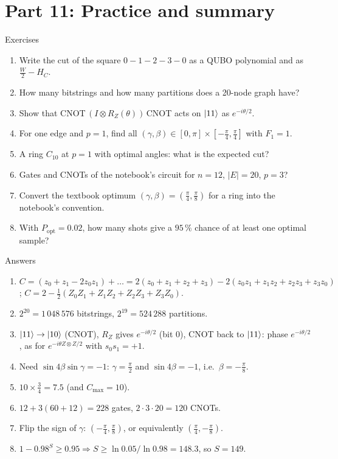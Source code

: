 \documentclass[aspectratio=169,11pt]{beamer}
\begin{document}
\section{Part 11: Practice and summary}
\begin{frame}{Exercises}
  \begin{enumerate}
    \item Write the cut of the square $0{-}1{-}2{-}3{-}0$ as a QUBO polynomial and as $\frac W2 - H_C$.
    \item How many bitstrings and how many partitions does a 20-node graph have?
    \item Show that CNOT$\,(I\otimes R_Z(\theta))\,$CNOT acts on $\ket{11}$ as $e^{-i\theta/2}$.
    \item For one edge and $p = 1$, find all $(\gamma, \beta) \in [0, \pi]\times[-\frac\pi4, \frac\pi4]$ with $F_1 = 1$.
    \item A ring $C_{10}$ at $p = 1$ with optimal angles: what is the expected cut?
    \item Gates and CNOTs of the notebook's circuit for $n = 12$, $|E| = 20$, $p = 3$?
    \item Convert the textbook optimum $(\gamma, \beta) = (\frac\pi4, \frac\pi8)$ for a ring into the notebook's convention.
    \item With $P_{\text{opt}} = 0.02$, how many shots give a $95\,\%$ chance of at least one optimal sample?
  \end{enumerate}
\end{frame}

\begin{frame}{Answers}
  \small
  \begin{enumerate}
    \item $C = (z_0 + z_1 - 2z_0z_1) + \dots = 2(z_0 + z_1 + z_2 + z_3) - 2(z_0z_1 + z_1z_2 + z_2z_3 + z_3z_0)$;
      $C = 2 - \frac12(Z_0Z_1 + Z_1Z_2 + Z_2Z_3 + Z_3Z_0)$.
    \item $2^{20} = 1\,048\,576$ bitstrings, $2^{19} = 524\,288$ partitions.
    \item $\ket{11} \to \ket{10}$ (CNOT), $R_Z$ gives $e^{-i\theta/2}$ (bit 0), CNOT back to $\ket{11}$: phase $e^{-i\theta/2}$, as for $e^{-i\theta Z\otimes Z/2}$ with $s_0s_1 = +1$.
    \item Need $\sin4\beta\sin\gamma = -1$: $\gamma = \frac\pi2$ and $\sin4\beta = -1$, i.e.\ $\beta = -\frac\pi8$.
    \item $10 \times \frac34 = 7.5$ (and $C_{\max} = 10$).
    \item $12 + 3(60 + 12) = 228$ gates, $2\cdot3\cdot20 = 120$ CNOTs.
    \item Flip the sign of $\gamma$: $(-\frac\pi4, \frac\pi8)$, or equivalently $(\frac\pi4, -\frac\pi8)$.
    \item $1 - 0.98^S \ge 0.95 \Rightarrow S \ge \ln0.05/\ln0.98 = 148.3$, so $S = 149$.
  \end{enumerate}
\end{frame}
\end{document}
